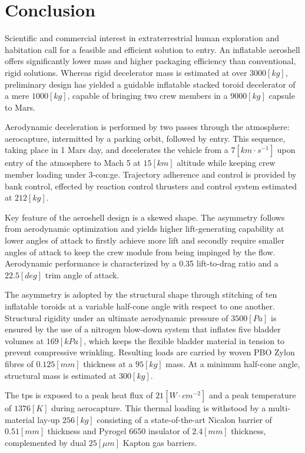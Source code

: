\section{Conclusion}

Scientific and commercial interest in extraterrestrial human exploration and habitation call for a feasible and efficient solution to entry. An inflatable aeroshell offers significantly lower mass and higher packaging efficiency than conventional, rigid solutions. Whereas rigid decelerator mass is estimated at over $3000 \left[kg\right] $, preliminary design has yielded a guidable inflatable stacked toroid decelerator of a mere $1000 \left[kg\right]$, capable of bringing two crew members in a $9000 \left[kg\right]$ capsule to Mars.

Aerodynamic deceleration is performed by two passes through the atmosphere: aerocapture, intermitted by a parking orbit, followed by entry. This sequence, taking place in 1 Mars day, and decelerates the vehicle from a $7 \left[km\cdot s^{-1}\right]$ upon entry of the atmosphere to Mach 5 at $15 \left[km\right]$ altitude while keeping crew member loading under 3-\gls{con:ge}. Trajectory adherence and control is provided by bank control, effected by reaction control thrusters and control system estimated at $212 \left[kg\right]$.

Key feature of the aeroshell design is a skewed shape. The asymmetry follows from aerodynamic optimization and yields higher lift-generating capability at lower angles of attack to firstly achieve more lift and secondly require smaller angles of attack to keep the crew module from being impinged by the flow. Aerodynamic performance is characterized by a 0.35 lift-to-drag ratio and a $22.5 \left[deg\right]$ trim angle of attack.

The asymmetry is adopted by the structural shape through stitching of ten inflatable toroids at a variable half-cone angle with respect to one another. Structural rigidity under an ultimate aerodynamic pressure of $3500 \left[Pa\right]$ is ensured by the use of a nitrogen blow-down system that inflates five bladder volumes at $169 \left[kPa\right]$, which keeps the flexible bladder material in tension to prevent compressive wrinkling. Resulting loads are carried by woven PBO Zylon\textsuperscript{\textregistered} fibres of $0.125 \left[mm\right]$ thickness at a $95 \left[kg\right]$ mass. At a minimum half-cone angle, structural mass is estimated at $300 \left[kg\right]$. 

The \acrlong{tps} is exposed to a peak heat flux of $21 \left[W\cdot cm^{-2}\right]$ and a peak temperature of $1376 \left[ K \right] $ during aerocapture. This thermal loading is withstood by a multi-material lay-up $256 \left[ kg \right] $ consisting of a state-of-the-art Nicalon barrier of $0.51 \left[ mm \right] $  thickness and Pyrogel\textsuperscript{\textregistered} 6650 insulator of $2.4 \left[ mm \right] $  thickness, complemented by dual $25 \left[ \mu m \right] $  Kapton gas barriers. 

